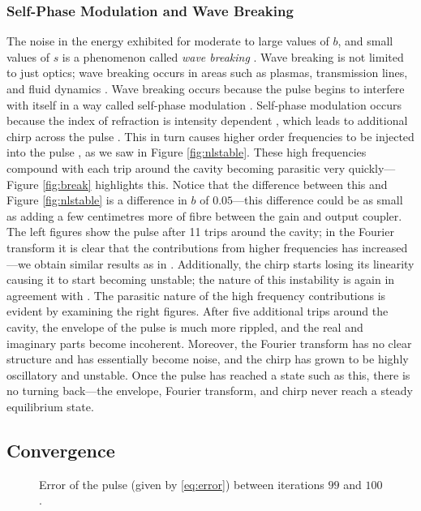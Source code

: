 \subsubsection{Self-Phase Modulation and Wave Breaking}

The noise in the energy exhibited for moderate to large values of $b$, and small values of $s$ is a phenomenon called \emph{wave breaking} \cite{agrawal2013, anderson, finot, rothenberg, tomlinson}. Wave breaking is not limited to just optics; wave breaking occurs in areas such as plasmas, transmission lines, and fluid dynamics \cite{rothenberg}. Wave breaking occurs because the pulse begins to interfere with itself in a way called self-phase modulation \cite{agrawal2002, agrawal2013, becker}. Self-phase modulation occurs because the index of refraction is intensity dependent \cite{agrawal2002, becker, rothenberg, silfvast}, which leads to additional chirp across the pulse \cite{agrawal2013, anderson, rothenberg, silfvast}. This in turn causes higher order frequencies to be injected into the pulse \cite{agrawal2013, anderson}, as we saw in Figure \ref{fig:nlstable}. These high frequencies compound with each trip around the cavity becoming parasitic very quickly---Figure \ref{fig:break} highlights this. Notice that the difference between this and Figure \ref{fig:nlstable} is a difference in $b$ of $0.05$---this difference could be as small as adding a few centimetres more of fibre between the gain and output coupler. The left figures show the pulse after 11 trips around the cavity; in the Fourier transform it is clear that the contributions from higher frequencies has increased---we obtain similar results as in \cite{anderson, rothenberg}. Additionally, the chirp starts losing its linearity causing it to start becoming unstable; the nature of this instability is again in agreement with \cite{anderson, rothenberg}. The parasitic nature of the high frequency contributions is evident by examining the right figures. After five additional trips around the cavity, the envelope of the pulse is much more rippled, and the real and imaginary parts become incoherent. Moreover, the Fourier transform has no clear structure and has essentially become noise, and the chirp has grown to be highly oscillatory and unstable. Once the pulse has reached a state such as this, there is no turning back---the envelope, Fourier transform, and chirp never reach a steady equilibrium state. \\

\subsection{Convergence}
\begin{figure}[tbp]

\caption[Error of the pulse.]{Error of the pulse (given by \eqref{eq:error}) between iterations $99$ and $100$.}
\label{fig:error}
\end{figure}

